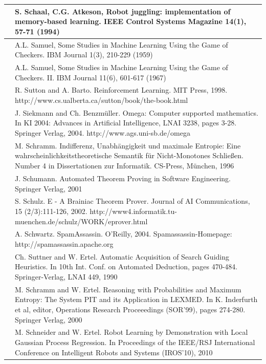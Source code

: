 \documentclass[10pt]{book}
\begin{document}
\begin{tabular}{|l|l|}
\hline [SA94] & S. Schaal, C.G. Atkeson, Robot juggling: implementation of memory-based learning. IEEE Control Systems Magazine 14(1), 57-71 (1994) \\
\hline [Sam59] & A.L. Samuel, Some Studies in Machine Learning Using the Game of Checkers. IBM Journal 1(3), 210-229 (1959) \\
\hline [\cite{samuel1967checkers2}] & A.L. Samuel, Some Studies in Machine Learning Using the Game of Checkers. II. IBM Journal 11(6), 601-617 (1967) \\
\hline [SB98] & R. Sutton and A. Barto. Reinforcement Learning. MIT Press, 1998. http://www.cs.ualberta.ca/sutton/book/the-book.html \\
\hline [SB04] & J. Siekmann and Ch. Benzm\"uller. Omega: Computer supported mathematics. In KI 2004: Advances in Artificial Intelligence, LNAI 3238, pages 3-28. Springer Verlag, 2004. http://www.ags.uni-sb.de/omega \\
\hline [Sch96] & M. Schramm. Indifferenz, Unabh\"angigkeit und maximale Entropie: Eine wahrscheinlichkeitstheoretische Semantik f\"ur Nicht-Monotones Schlie\ss{}en. Number 4 in Dissertationen zur Informatik. CS-Press, M\"unchen, 1996 \\
\hline [Sch01] & J. Schumann. Automated Theorem Proving in Software Engineering. Springer Verlag, 2001 \\
\hline [Sch02] & S. Schulz. E - A Brainiac Theorem Prover. Journal of AI Communications, 15 (2/3):111-126, 2002. http://www4.informatik.tu-muenchen.de/schulz/WORK/eprover.html \\
\hline [Sch04] & A. Schwartz. SpamAssassin. O'Reilly, 2004. Spamassassin-Homepage: http://spamassassin.apache.org \\
\hline [SE90] & Ch. Suttner and W. Ertel. Automatic Acquisition of Search Guiding Heuristics. In 10th Int. Conf. on Automated Deduction, pages 470-484. Springer-Verlag, LNAI 449, 1990 \\
\hline [SE00] & M. Schramm and W. Ertel. Reasoning with Probabilities and Maximum Entropy: The System PIT and its Application in LEXMED. In K. Inderfurth et al, editor, Operations Research Proceeedings (SOR'99), pages 274-280. Springer Verlag, 2000 \\
\hline [SE10] & M. Schneider and W. Ertel. Robot Learning by Demonstration with Local Gaussian Process Regression. In Proceedings of the IEEE/RSJ International Conference on Intelligent Robots and Systems (IROS'10), 2010 \\

\end{tabular}
\end{document}

